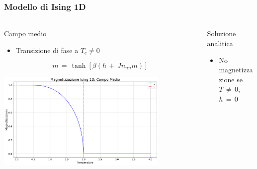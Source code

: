 \begin{frame}
    \frametitle{Modello di Ising 1D}
    \framesubtitle{}

    \begin{columns}

        \begin{column}{0.5\textwidth}
			\begin{block}{Campo medio}     

                \begin{itemize}[itemsep=0.5em, label=$\diamond$]
                    \item Transizione di fase a $T_c \neq 0$
                \end{itemize}
                
			    $$ m\,=\,\tanh{\left[\beta\left(h\,+\,Jn_{nn}m\right)\right]} $$

			    \vspace{0.7cm}

                \centering
				\includegraphics[width=0.8\textwidth]{Immagini/Introduzione/magn_Ising1D_mf.png}

            \end{block}
        \end{column}


        \begin{column}{0.5\textwidth}
            \begin{block}{Soluzione analitica}
			
			    \begin{itemize}[itemsep=0.5em, label=$\diamond$]
                    \item No magnetizzazione se $T\,\neq\,0$, $h\,=\,0$
                \end{itemize}


\end{block}
\end{column}
\end{columns}
\end{frame}
